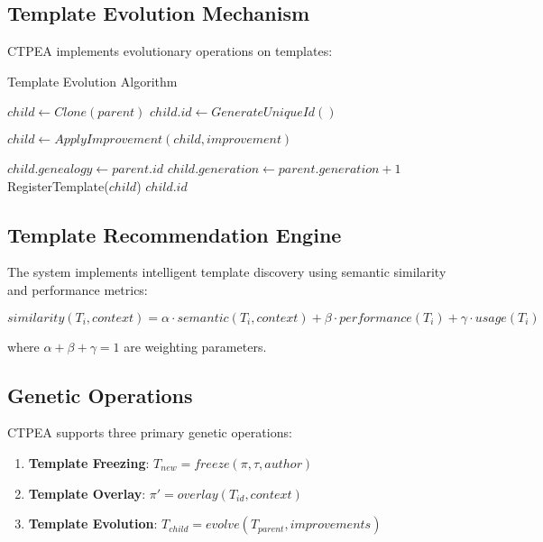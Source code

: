 \documentclass[12pt,a4paper]{article}
\begin{document}
\subsection{Template Evolution Mechanism}

CTPEA implements evolutionary operations on templates:

\begin{algorithm}[H]
\caption{Template Evolution Algorithm}
\begin{algorithmic}[1]
    \State $child \leftarrow Clone(parent)$
    \State $child.id \leftarrow GenerateUniqueId()$
    
        \State $child \leftarrow ApplyImprovement(child, improvement)$
    \EndFor
    
    \State $child.genealogy \leftarrow parent.id$
    \State $child.generation \leftarrow parent.generation + 1$
    \State RegisterTemplate($child$)
    \State \Return $child.id$
\EndFunction
\end{algorithmic}
\end{algorithm}

\subsection{Template Recommendation Engine}

The system implements intelligent template discovery using semantic similarity and performance metrics:

\begin{equation}
similarity(T_i, context) = \alpha \cdot semantic(T_i, context) + \beta \cdot performance(T_i) + \gamma \cdot usage(T_i)
\end{equation}

where $\alpha + \beta + \gamma = 1$ are weighting parameters.

\subsection{Genetic Operations}

CTPEA supports three primary genetic operations:

\begin{enumerate}
\item \textbf{Template Freezing}: $T_{new} = freeze(\pi, \tau, author)$
\item \textbf{Template Overlay}: $\pi' = overlay(T_{id}, context)$
\item \textbf{Template Evolution}: $T_{child} = evolve(T_{parent}, improvements)$
\end{enumerate}
\end{document}
